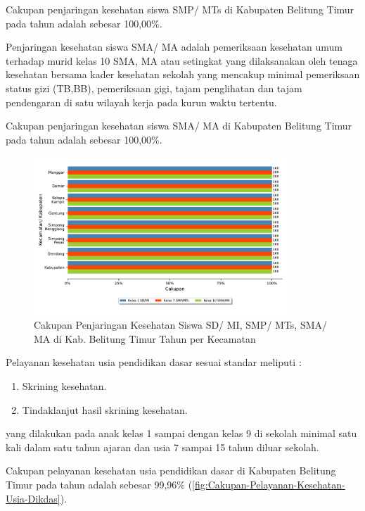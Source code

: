 Cakupan penjaringan kesehatan siswa SMP/ MTs di Kabupaten Belitung Timur pada tahun \tP adalah sebesar 100,00\%.

Penjaringan kesehatan siswa SMA/ MA adalah pemeriksaan kesehatan umum terhadap murid kelas 10 SMA, MA atau setingkat yang dilaksanakan oleh tenaga kesehatan bersama kader kesehatan sekolah yang mencakup minimal pemeriksaan status gizi (TB,BB), pemeriksaan gigi, tajam penglihatan dan tajam pendengaran di satu wilayah kerja pada kurun waktu tertentu.

Cakupan penjaringan kesehatan siswa SMA/ MA di Kabupaten Belitung Timur pada tahun \tP adalah sebesar 100,00\%.

\begin{figure}[H]
    \centering
    \includegraphics[width=0.85\textwidth]{bab_05/bab_05_26_kesehatanSiswa}
    \caption{Cakupan Penjaringan Kesehatan Siswa SD/ MI, SMP/ MTs, SMA/ MA di Kab. Belitung Timur Tahun \tP per Kecamatan}
    \label{fig:Cakupan-Penjaringan-Siswa}
\end{figure}

Pelayanan kesehatan usia pendidikan dasar sesuai standar meliputi :
\begin{enumerate}
    \item Skrining kesehatan.
    \item Tindaklanjut hasil skrining kesehatan.
\end{enumerate}
yang dilakukan pada anak kelas 1 sampai dengan kelas 9 di sekolah minimal satu kali dalam satu tahun ajaran dan usia 7 sampai 15 tahun diluar sekolah.

Cakupan pelayanan kesehatan usia pendidikan dasar di Kabupaten Belitung Timur pada tahun \tP adalah sebesar 99,96\% (\autoref{fig:Cakupan-Pelayanan-Kesehatan-Usia-Dikdas}).

